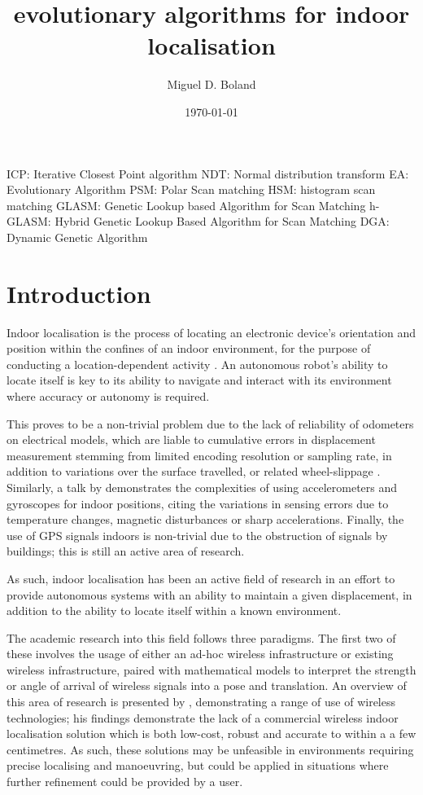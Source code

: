 \documentclass[authoryearcitations]{UoYCSproject}
\author{Miguel D. Boland}
\title{evolutionary algorithms for indoor localisation}
\date{\today}
\begin{document}
\maketitle
\listoffigures
\listoftables
ICP: Iterative Closest Point algorithm
NDT: Normal distribution transform
EA: Evolutionary Algorithm
PSM: Polar Scan matching
HSM: histogram scan matching
GLASM: Genetic Lookup based Algorithm for Scan Matching
h-GLASM: Hybrid Genetic Lookup Based Algorithm for Scan Matching
DGA: Dynamic Genetic Algorithm


\chapter{Introduction}
\label{cha:Introduction}
Indoor localisation is the process of locating an electronic device's orientation and position within the confines of an indoor environment, for the purpose of conducting a location-dependent activity \cite{Curran2011-zs}. An autonomous robot's ability to locate itself is key to its ability to navigate and interact with its environment where accuracy or autonomy is required. 

This proves to be a non-trivial problem due to the lack of reliability of odometers on electrical models, which are liable to cumulative errors in displacement measurement stemming from limited encoding resolution or sampling rate, in addition to variations over the surface travelled, or related wheel-slippage \cite{Borenstein1996-al}. Similarly, a talk by \citet{Sachs2010-pw} demonstrates the complexities of using accelerometers and gyroscopes for indoor positions, citing the variations in sensing errors due to temperature changes, magnetic disturbances or sharp accelerations. Finally, the use of GPS signals indoors is non-trivial due to the obstruction of signals by buildings; this is still an active area of research. \cite{Gowdayyanadoddi2015-hg}

As such, indoor localisation has been an active field of research in an effort to provide autonomous systems with an ability to maintain a given displacement, in addition to the ability to locate itself within a known environment. 

The academic research into this field follows three paradigms. The first two of these involves the usage of either an ad-hoc wireless infrastructure or existing wireless infrastructure, paired with mathematical models to interpret the strength or angle of arrival of wireless signals into a pose and translation. An overview of this area of research is presented by \citet{Liu2007-in}, demonstrating a range of use of wireless technologies; his findings demonstrate the lack of a commercial wireless indoor localisation solution which is both low-cost, robust and accurate to within a a few centimetres. As such, these solutions may be unfeasible in environments requiring precise localising and manoeuvring, but could be applied in situations where further refinement could be provided by a user. 
\end{document}

